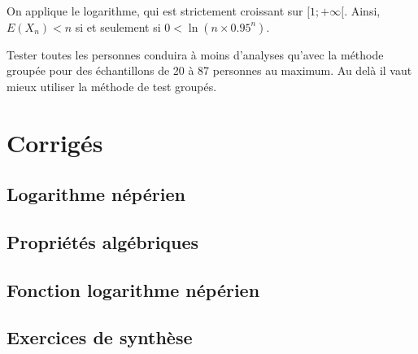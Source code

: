 \documentclass[11pt,fleqn, openany]{book} %
\begin{document}
\begin{solution}
\begin{enumerate}
On applique le logarithme, qui est strictement croissant sur $[1;+\infty[$. Ainsi, $E(X_n)<n$ si et seulement si $0< \ln(n \times 0.95^n)$.

Tester toutes les personnes conduira à moins d'analyses qu'avec la méthode groupée pour des échantillons de 20 à 87 personnes au maximum. Au delà il vaut mieux utiliser
la méthode de test groupés.\end{enumerate}
\end{solution}


\chapter{Corrigés}

\section*{Logarithme népérien}

\printsolutions[collection={log01}, headings={false} ]

\section*{Propriétés algébriques}

\printsolutions[collection={log02}, headings={false} ]

\section*{Fonction logarithme népérien}

\printsolutions[collection={log03}, headings={false} ]

\section*{Exercices de synthèse}

\printsolutions[collection={log04}, headings={false} ]
\end{document}
